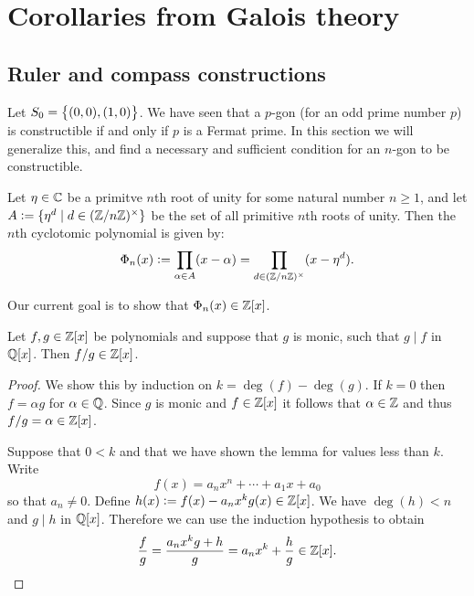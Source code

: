 \documentclass[11pt,a4paper]{article}
\begin{document}
\newpage

\section{Corollaries from Galois theory}
\subsection{Ruler and compass constructions}
\begin{remark}
  Let $S_0 = \left\{(0,0),(1,0)\right\}$.
  We have seen that a $p$-gon (for an odd prime number $p$)
  is constructible if and only if $p$ is a Fermat prime.
  In this section we will generalize this,
  and find a necessary and sufficient condition
  for an $n$-gon to be constructible.
\end{remark}

\begin{definition}
  Let $\eta \in \mathbb{C}$ be a primitve $n$th root of unity
  for some natural number $n \geq 1$,
  and let $A := \{\eta^d \mid d \in (\mathbb{Z}/n\mathbb{Z})^{\times}\}$
  be the set of all primitive $n$th roots of unity.
  Then the $n$th cyclotomic polynomial is given by:
  \[
    \Phi_n(x) :=
    \prod_{\alpha \in A}(x - \alpha) =
    \prod_{d \in (\mathbb{Z}/n\mathbb{Z})^{\times}}(x - \eta^d).
  \]
\end{definition}

\begin{remark}
  Our current goal is to show that $\Phi_n(x) \in \mathbb{Z}[x]$.
\end{remark}

\begin{lemma}
  \label{lem:cyclotomic-polynomials-are-over-z}
  Let $f,g \in \mathbb{Z}[x]$ be polynomials and suppose that $g$ is monic,
  such that $g \mid f$ in $\mathbb{Q}[x]$.
  Then $f/g \in \mathbb{Z}[x]$.
\end{lemma}
\begin{proof}
  We show this by induction on $k = \deg(f) - \deg(g)$.
  If $k = 0$ then $f = \alpha g$ for $\alpha \in \mathbb{Q}$.
  Since $g$ is monic and $f \in \mathbb{Z}[x]$ it follows that $\alpha \in \mathbb{Z}$
  and thus $f/g = \alpha \in \mathbb{Z}[x]$.

  Suppose that $0 < k$ and that we have shown the lemma for values
  less than $k$.
  Write
  \[
    f(x) = a_n x^n + \cdots + a_1 x + a_0
  \]
  so that $a_n \neq 0$.
  Define $h(x) := f(x) - a_n x^k g(x) \in \mathbb{Z}[x]$.
  We have $\deg(h) < n$ and $g \mid h$ in $\mathbb{Q}[x]$.
  Therefore we can use the induction hypothesis to obtain
  \[
    \frac{f}{g} = \frac{a_n x^k g + h}{g} =
    a_n x^k + \frac{h}{g} \in \mathbb{Z}[x].
  \]
\end{proof}
\end{document}
